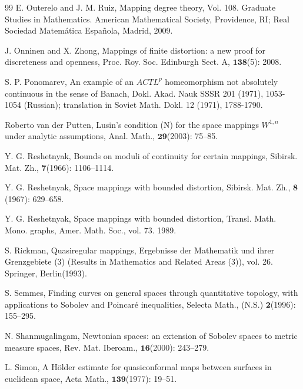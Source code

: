 \documentclass[11pt,twoside]{article}
\theoremstyle{definition}
\theoremstyle{remark}
\begin{document}
\begin{thebibliography}{99}
 E. Outerelo and J. M. Ruiz, Mapping degree theory, Vol. 108. Graduate Studies in Mathematics. American Mathematical Society, Providence, RI; Real Sociedad
 Matem\'{a}tica Espa\~{n}ola, Madrid, 2009.


 J. Onninen and X. Zhong, Mappings of finite distortion: a new proof for discreteness and openness, Proc. Roy. Soc. Edinburgh Sect. A, $\mathbf{138}$(5): 2008.


S. P. Ponomarev, An example of an $ACTL^{p}$ homeomorphism not absolutely continuous in the sense of Banach, Dokl. Akad. Nauk SSSR 201 (1971), 1053-1054 (Russian); translation in Soviet Math. Dokl. 12 (1971), 1788-1790.



Roberto van der Putten,  Lusin's condition (N) for the space mappings $W^{1,n}$ under analytic assumptions, Anal. Math., $\mathbf{29}$(2003): 75–85. 














Y. G. Reshetnyak, Bounds on moduli of continuity for certain mappings, Sibirsk. Mat. Zh., $\mathbf{7}$(1966): 1106–1114.

Y. G. Reshetnyak, Space mappings with bounded distortion, Sibirsk. Mat. Zh., $\mathbf{8}$(1967): 629–658.

Y. G. Reshetnyak, Space mappings with bounded distortion, Transl. Math. Mono. graphs, Amer. Math. Soc., vol. 73. 1989.




S. Rickman, Quasiregular mappings, Ergebnisse der Mathematik und ihrer Grenzgebiete (3) (Results in Mathematics and Related Areas (3)), vol. 26. Springer, Berlin(1993).


S. Semmes,  Finding curves on general spaces through quantitative topology, with applications to Sobolev and Poincar\'{e} inequalities, Selecta Math., (N.S.) $\mathbf{2}$(1996): 155–295.


N. Shanmugalingam, Newtonian spaces: an extension of Sobolev spaces to metric measure spaces, Rev. Mat. Iberoam., $\mathbf{16}$(2000): 243–279.

L. Simon, A H\"{o}lder estimate for quasiconformal maps between surfaces in euclidean space, Acta Math., $\mathbf{139}$(1977): 19–51.


\end{thebibliography}
\end{document}
